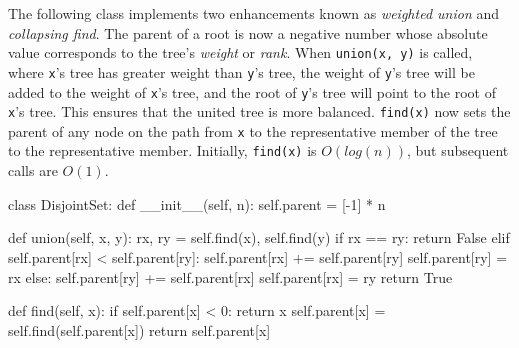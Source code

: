 \documentclass[12pt]{article}
\begin{document}
The following class implements two enhancements known as \textit{weighted union} and \textit{collapsing find}. The parent of a root is now a negative number whose absolute value corresponds to the tree's \textit{weight} or \textit{rank}. When \texttt{union(x, y)} is called, where \texttt{x}'s tree has greater weight than \texttt{y}'s tree, the weight of \texttt{y}'s tree will be added to the weight of \texttt{x}'s tree, and the root of \texttt{y}'s tree will point to the root of \texttt{x}'s tree. This ensures that the united tree is more balanced. \texttt{find(x)} now sets the parent of any node on the path from \texttt{x} to the representative member of the tree to the representative member. Initially, \texttt{find(x)} is $O(log(n))$, but subsequent calls are $O(1)$.
\medskip
\begin{python}
class DisjointSet:
    def __init__(self, n):
        self.parent = [-1] * n

    def union(self, x, y):
        rx, ry = self.find(x), self.find(y)
        if rx == ry:
            return False
        elif self.parent[rx] < self.parent[ry]:
            self.parent[rx] += self.parent[ry]
            self.parent[ry] = rx
        else:
            self.parent[ry] += self.parent[rx]
            self.parent[rx] = ry
        return True

    def find(self, x):
        if self.parent[x] < 0:
            return x
        self.parent[x] = self.find(self.parent[x])
        return self.parent[x]
\end{python}
\end{document}
